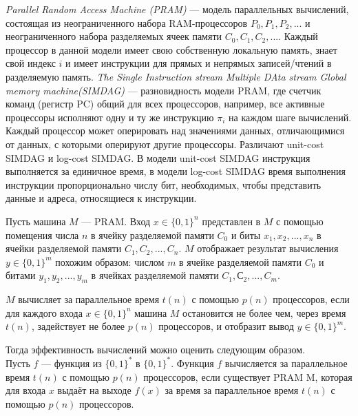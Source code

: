 \textit{Parallel Random Access Machine (PRAM)} --- модель параллельных вычислений, состоящая из неограниченного набора RAM-процессоров $P_0, P_1, P_2, ... $ и неограниченного набора разделяемых ячеек памяти $C_0, C_1, C_2, ... $. Каждый процессор в данной модели имеет свою собственную локальную память, знает свой индекс $i$ и имеет инструкции для прямых и непрямых записей/чтений в разделяемую память. \textit{The Single Instruction stream Multiple DAta stream Global memory machine(SIMDAG)} --- разновидность модели PRAM, где счетчик команд (регистр PC) общий для всех процессоров, например, все активные процессоры исполняют одну и ту же инструкцию $\pi_i$ на каждом шаге вычислений. Каждый процессор может оперировать над значениями данных, отличающимися от данных, с которыми оперируют другие процессоры. Различают unit-cost SIMDAG и log-cost SIMDAG. В модели unit-cost SIMDAG инструкция выполняется за единичное время, в модели log-cost SIMDAG время выполнения инструкции пропорционально числу бит, необходимых, чтобы представить данные и адреса, относящиеся к инструкции.

Пусть машина $M$ --- PRAM. Вход $x \in {\{0, 1\}}^n$ представлен в $M$ с помощью помещения числа $n$ в ячейку разделяемой памяти $C_0$ и биты $x_1, x_2, ..., x_n$ в ячейки разделяемой памяти $C_1, C_2, ..., C_n$. $M$ отображает результат вычисления $y \in {\{0, 1\}}^m$ похожим образом: числом $m$ в ячейке разделяемой памяти $C_0$ и битами $y_1, y_2, ..., y_m$ в ячейках разделяемой памяти $C_1,  С_2, ..., C_m$.

$M$ вычисляет за параллельное время $t(n)$ с помощью $p(n)$ процессоров, если для каждого входа $x \in {\{0, 1\}}^n$ машина $M$ остановится не более чем, через время $t(n)$, задействует не более $p(n)$ процессоров, и отобразит вывод $y \in {\{0, 1\}}^m$.

Тогда эффективность вычислений можно оценить следующим образом.
\\Пусть  $f$ --- функция из $ {\{0, 1\}}^*$ в $ {\{0, 1\}}^*$. Функция $f$ вычисляется за параллельное время $t(n)$ с помощью $p(n)$ процессоров, если существует PRAM M, которая для входа $x$ выдаёт на выходе $f(x)$ за время за параллельное время $t(n)$ с помощью $p(n)$ процессоров.

